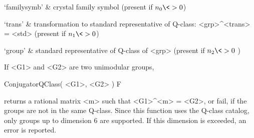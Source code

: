`familysymb' & crystal family symbol (present if $n_{0} \<> 0$)

`trans'      & transformation to standard representative of Q-class: 
               <grp>\^{}<trans> = <std>
               (present if $n_{1} \<> 0$)

`group'      & standard representative of Q-class of <grp> 
               (present if $n_{2} \<> 0$ )
\enditems

If <G1> and <G2> are two unimodular groups,

\>ConjugatorQClass( <G1>, <G2> ) F

returns a rational matrix <m> such that <G1>\^{}<m> = <G2>, or fail, if 
the groups are not in the same Q-class. Since this function uses the 
{\CARAT} Q-class catalog, only groups up to dimension 6 are supported. 
If this dimension is exceeded, an error is reported.


